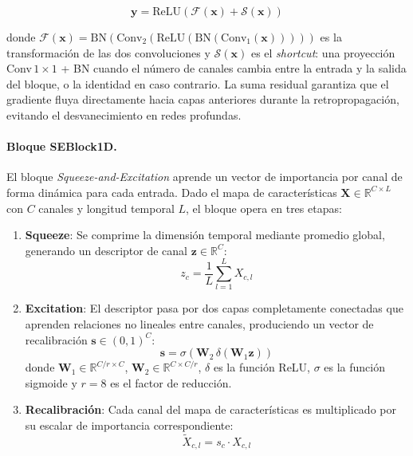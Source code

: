\begin{equation}
\mathbf{y} = \text{ReLU}\!\left(\mathcal{F}(\mathbf{x}) + \mathcal{S}(\mathbf{x})\right)
\label{eq:resblock}
\end{equation}

donde $\mathcal{F}(\mathbf{x}) = \text{BN}(\text{Conv}_2(\text{ReLU}(\text{BN}(\text{Conv}_1(\mathbf{x})))))$ es la transformación de las dos convoluciones y $\mathcal{S}(\mathbf{x})$ es el \textit{shortcut}: una proyección Conv\,$1\times 1$ + BN cuando el número de canales cambia entre la entrada y la salida del bloque, o la identidad en caso contrario. La suma residual garantiza que el gradiente fluya directamente hacia capas anteriores durante la retropropagación, evitando el desvanecimiento en redes profundas.

\paragraph{Bloque SEBlock1D.}
El bloque \textit{Squeeze-and-Excitation} aprende un vector de importancia por canal de forma dinámica para cada entrada. Dado el mapa de características $\mathbf{X} \in \mathbb{R}^{C \times L}$ con $C$ canales y longitud temporal $L$, el bloque opera en tres etapas:

\begin{enumerate}
\item \textbf{Squeeze}: Se comprime la dimensión temporal mediante promedio global, generando un descriptor de canal $\mathbf{z} \in \mathbb{R}^C$:
\begin{equation}
z_c = \frac{1}{L} \sum_{l=1}^{L} X_{c,l}
\label{eq:squeeze}
\end{equation}

\item \textbf{Excitation}: El descriptor pasa por dos capas completamente conectadas que aprenden relaciones no lineales entre canales, produciendo un vector de recalibración $\mathbf{s} \in (0,1)^C$:
\begin{equation}
\mathbf{s} = \sigma\!\left(\mathbf{W}_2\,\delta\!\left(\mathbf{W}_1 \mathbf{z}\right)\right)
\label{eq:excitation}
\end{equation}
donde $\mathbf{W}_1 \in \mathbb{R}^{C/r \times C}$, $\mathbf{W}_2 \in \mathbb{R}^{C \times C/r}$, $\delta$ es la función ReLU, $\sigma$ es la función sigmoide y $r=8$ es el factor de reducción.

\item \textbf{Recalibración}: Cada canal del mapa de características es multiplicado por su escalar de importancia correspondiente:
\begin{equation}
\tilde{X}_{c,l} = s_c \cdot X_{c,l}
\label{eq:recal}
\end{equation}
\end{enumerate}

